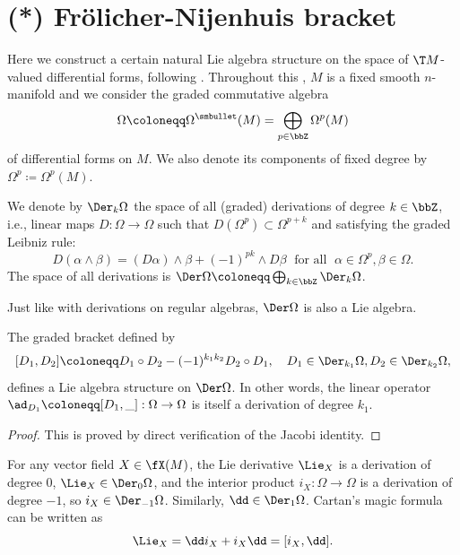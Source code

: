 \section{(*) Fr\"olicher-Nijenhuis bracket}\label{sec: Frolicher}


Here we construct a certain natural Lie algebra structure on the space of $\T M$-valued differential forms, following \cite{Kolar}. Throughout this \sect, $M$ is a fixed smooth $n$-manifold and we consider the graded commutative algebra 
\[\Omega\coloneqq \Omega^{\smbullet}(M)=\bigoplus_{p\in\bbZ} \Omega^p(M)\] of differential forms on $M$. We also denote its components of fixed degree by $\Omega^p\coloneqq \Omega^p(M)$. 

\begin{defn}
    We denote by $\Der_k\Omega$ the space of all (graded) derivations of degree $k\in\bbZ$, i.e., linear maps $D:\Omega\to \Omega$ such that $D(\Omega^p)\subset \Omega^{p+k}$ and satisfying the graded Leibniz rule:
    \[D(\alpha\wedge\beta)=(D\alpha)\wedge\beta+(-1)^{pk}\wedge D\beta \;\text{ for all }\;\alpha\in\Omega^p,\beta\in\Omega.\]
    The space of all derivations is $\Der\Omega\coloneqq \bigoplus_{k\in\bbZ} \Der_k\Omega$.
\end{defn}

Just like with derivations on regular algebras, $\Der\Omega$ is also a Lie algebra.

\begin{lem}
    The graded bracket defined by
    \[[D_1,D_2]\coloneqq D_1\circ D_2-(-1)^{k_1k_2}D_2\circ D_1,\quad D_1\in\Der_{k_1}\Omega,D_2\in\Der_{k_2}\Omega,\]
    defines a Lie algebra structure on $\Der\Omega$. In other words, the linear operator $\ad_{D_1}\coloneqq [D_1,\_]:\Omega\to \Omega$ is itself a derivation of degree $k_1$.
\end{lem}
\begin{proof}
    This is proved by direct verification of the Jacobi identity.
\end{proof}

\begin{example}
    For any vector field $X\in\fX(M)$, the Lie derivative $\Lie_X$ is a derivation of degree $0$, $\Lie_X\in\Der_0\Omega$, and the interior product $i_X:\Omega\to \Omega$ is a derivation of degree $-1$, so $i_X\in\Der_{-1}\Omega$. Similarly, $\dd\in\Der_1\Omega$. Cartan's magic formula can be written as 
    \[\Lie_X=\dd i_X+i_X \dd=[i_X,\dd].\]
\end{example}

